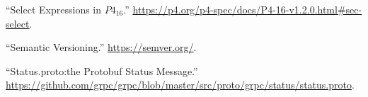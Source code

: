 \documentclass[11pt]{article}
\begin{document}
{{\begin{thebibliography}{37}
\mdbibitemlabel{{}[25]}\textquotedblleft{}Select Expressions in $P4_{16}$.\textquotedblright{} \href{https://p4.org/p4-spec/docs/P4-16-v1.2.0.html\%23sec-select}{{\ttfamily https://\hspace{0pt}p4.\hspace{0pt}org/\hspace{0pt}p4-\hspace{0pt}spec/\hspace{0pt}docs/\hspace{0pt}P4-\hspace{0pt}16-\hspace{0pt}v1.\hspace{0pt}2.\hspace{0pt}0.\hspace{0pt}html\#\hspace{0pt}sec-\hspace{0pt}select}}.\label{p4selectexpr}%

\mdbibitemlabel{{}[26]}\textquotedblleft{}Semantic Versioning.\textquotedblright{} \href{https://semver.org/}{{\ttfamily https://\hspace{0pt}semver.\hspace{0pt}org/\hspace{0pt}}}.\label{semver}%

\mdbibitemlabel{{}[27]}\textquotedblleft{}Status.proto:the Protobuf Status Message.\textquotedblright{} \href{https://github.com/grpc/grpc/blob/master/src/proto/grpc/status/status.proto}{{\ttfamily https://\hspace{0pt}github.\hspace{0pt}com/\hspace{0pt}grpc/\hspace{0pt}grpc/\hspace{0pt}blob/\hspace{0pt}master/\hspace{0pt}src/\hspace{0pt}proto/\hspace{0pt}grpc/\hspace{0pt}status/\hspace{0pt}status.\hspace{0pt}proto}}.\label{protostatus}%


\end{thebibliography}}}
\end{document}
